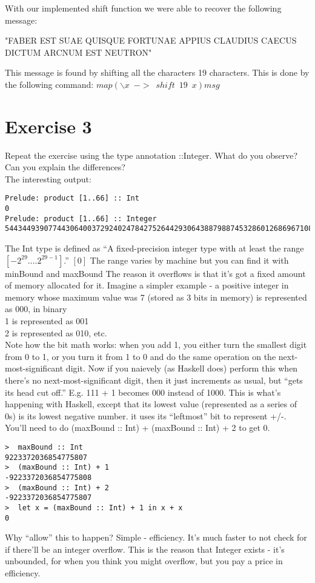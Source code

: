 \documentclass{article}
\begin{document}
With our implemented shift function we were able to recover the following message:

"FABER EST SUAE QUISQUE FORTUNAE APPIUS CLAUDIUS CAECUS DICTUM ARCNUM EST NEUTRON"

This message is found by shifting all the characters 19 characters. This is done by the following command:
$map (\backslash x \enspace -> \enspace shift \enspace 19 \enspace x)msg$

\newpage
\section*{Exercise 3}
Repeat the exercise using the type annotation ::Integer. What do you observe? Can you explain the differences?\\
\newline
The interesting output:
\begin{lstlisting}
Prelude: product [1..66] :: Int
0
Prelude: product [1..66] :: Integer
544344939077443064003729240247842752644293064388798874532860126869671081148416000000000000000
\end{lstlisting}
The Int type is defined as ``A fixed-precision integer type with at least the range $[-2^{29} \dots. 2^{29-1}]$.'' $[0]$ The range varies by machine but you can find it with minBound and maxBound
\newline
The reason it overflows is that it's got a fixed amount of memory allocated for it. Imagine a simpler example - a positive integer in memory whose maximum value was 7 (stored as 3 bits in memory)
\newline
{} is represented as 000, in binary\\
1 is represented as 001\\
2 is represented as 010, etc.\\
\newline
Note how the bit math works: when you add 1, you either turn the smallest digit from 0 to 1, or you turn it from 1 to 0 and do the same operation on the next-most-significant digit.
\newline
\newline
Now if you naievely (as Haskell does) perform this when there's no next-most-significant digit, then it just increments as usual, but ``gets its head cut off.'' E.g. 111 + 1 becomes 000 instead of 1000. This is what's happening with Haskell, except that its lowest value (represented as a series of 0s) is its lowest negative number. it uses its ``leftmost'' bit to represent +/-. You'll need to do (maxBound :: Int) + (maxBound :: Int) + 2 to get 0.
\begin{lstlisting}
>  maxBound :: Int
9223372036854775807
>  (maxBound :: Int) + 1
-9223372036854775808
>  (maxBound :: Int) + 2
-9223372036854775807
>  let x = (maxBound :: Int) + 1 in x + x
0
\end{lstlisting}
Why ``allow'' this to happen? Simple - efficiency. It's much faster to not check for if there'll be an integer overflow. This is the reason that Integer exists - it's unbounded, for when you think you might overflow, but you pay a price in efficiency.
\end{document}
